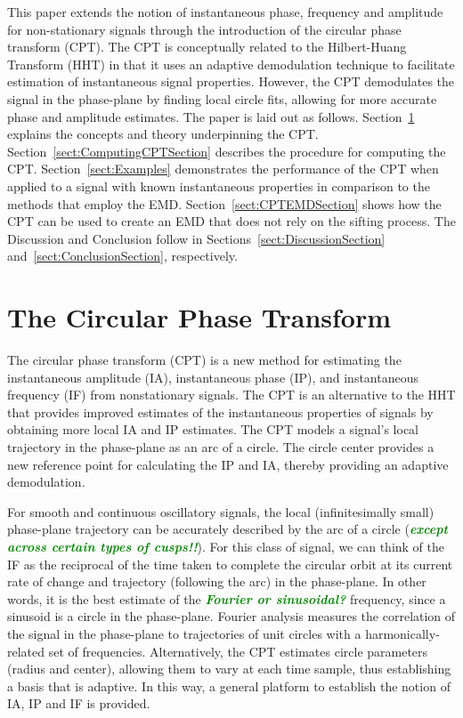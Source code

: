 \documentclass[a4paper]{IEEEtran}
\newcommand{\dean}[1]{\textsf{\emph{\textbf{\textcolor{green}{#1}}}}}
\begin{document}
This paper extends the notion of instantaneous phase, frequency and amplitude for non-stationary signals through the introduction of the circular phase transform (CPT). The CPT is conceptually related to the Hilbert-Huang Transform (HHT) in that it uses an adaptive demodulation technique to facilitate estimation of instantaneous signal properties. However, the CPT demodulates the signal in the phase-plane by finding local circle fits, allowing for more accurate phase and amplitude estimates. The paper is laid out as follows. Section~\ref{sect:CPTDescriptionSection} explains the concepts and theory underpinning the CPT. Section~\ref{sect:ComputingCPTSection} describes the procedure for computing the CPT. Section~\ref{sect:Examples} demonstrates the performance of the CPT when applied to a signal with known instantaneous properties in comparison to the methods that employ the EMD. Section~\ref{sect:CPTEMDSection} shows how the CPT can be used to create an EMD that does not rely on the sifting process. %
The Discussion and Conclusion follow in Sections~\ref{sect:DiscussionSection} and~\ref{sect:ConclusionSection}, respectively. 

\section{The Circular Phase Transform}\label{sect:CPTDescriptionSection}
The circular phase transform (CPT) is a new method for estimating the instantaneous amplitude (IA), instantaneous phase (IP), and instantaneous frequency (IF) from nonstationary signals. The CPT is an alternative to the HHT that provides improved estimates of the instantaneous properties of signals by obtaining more local IA and IP estimates. The CPT models a signal's local trajectory in the phase-plane as an arc of a circle. The circle center provides a new reference point for calculating the IP and IA, thereby providing an adaptive demodulation.

For smooth and continuous oscillatory signals, the local (infinitesimally small) phase-plane trajectory can be accurately described by the arc of a circle (\dean{except across certain types of cusps!!}). For this class of signal, we can think of the IF as the reciprocal of the time taken to complete the circular orbit at its current rate of change and trajectory (following the arc) in the phase-plane. In other words, it is the best estimate of the \dean{Fourier or sinusoidal?} frequency, since a sinusoid is a circle in the phase-plane. Fourier analysis measures the correlation of the signal in the phase-plane to trajectories of unit circles with a harmonically-related set of frequencies. Alternatively, the CPT estimates circle parameters (radius and center), allowing them to vary at each time sample, thus establishing a basis that is adaptive. In this way, a general platform to establish the notion of IA, IP and IF is provided.
\end{document}
